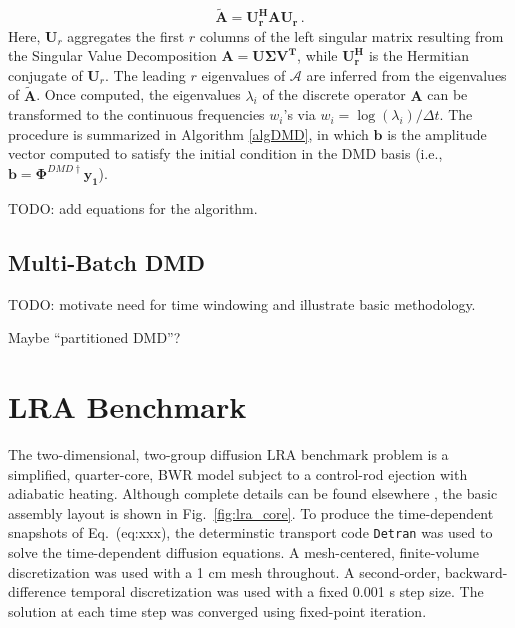 \documentclass{anstrans}
\renewcommand{\vec}[1]{\bm{#1}} %
\begin{document}
\begin{equation}
\mathbf{\tilde{A}} = \mathbf{U_r^{H}AU_r} \, .
\end{equation}
Here, $\mathbf{U}_r$ aggregates the first $r$ columns of the left singular matrix resulting from the Singular Value Decomposition $ {\mathbf{A = U\Sigma V^T}}$, while $ \mathbf{U_r^{H}}$ is the Hermitian conjugate of $\mathbf{U}_r$.
The leading $r$ eigenvalues of $\mathcal{A}$ are inferred from the eigenvalues of $\mathbf{\tilde{A}}$. 
Once computed, the eigenvalues $\lambda_i$ of the discrete operator $\mathbf{A}$ can be transformed to the continuous frequencies $w_i$'s via $w_i=\log(\lambda_i)/\Delta t$.
The procedure is summarized in Algorithm \ref{algDMD}, in which $\vec{b}$ is the amplitude vector computed to satisfy the initial condition in the DMD basis (i.e., $\vec{b}={\boldsymbol{\Phi}^{DMD\dagger}} \vec{y_1}$).

TODO: add equations for the algorithm.

\subsection{Multi-Batch DMD}

TODO: motivate need for time windowing and illustrate basic methodology.

Maybe ``partitioned DMD''?  

\section{LRA Benchmark}
\label{sec:application}


The two-dimensional, two-group diffusion LRA benchmark problem is a simplified, quarter-core, BWR model subject to a control-rod ejection with adiabatic heating.
Although complete details can be found elsewhere \cite{}, the basic assembly layout is shown in Fig.~\ref{fig:lra_core}.
To produce the time-dependent snapshots of Eq.~({eq:xxx}), the determinstic transport code {\tt Detran} \cite{} was used to solve the time-dependent diffusion equations.  
A mesh-centered, finite-volume discretization was used with a 1 cm mesh throughout.
A second-order, backward-difference temporal discretization was used with a fixed 0.001 s step size.  
The solution at each time step was converged using fixed-point iteration.
\end{document}
